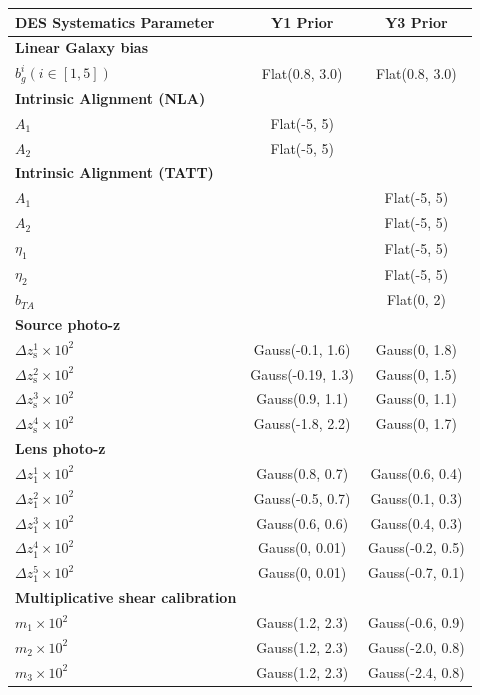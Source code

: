 \begin{table}
\centering
\begin{tabular}{lcc} %
\hline
DES Systematics Parameter &  Y1 Prior & Y3 Prior \\
\hline\hline
\textbf{Linear Galaxy bias} \\
$ b_g^i(i \in [1,5])$ & Flat(0.8, 3.0) & Flat(0.8, 3.0)\\
\hline
\textbf{Intrinsic Alignment (NLA)} \\
$A_{1}$ &  Flat(-5, 5) & \\
$A_{2}$ &  Flat(-5, 5) & \\
\hline
\textbf{Intrinsic Alignment (TATT)} \\
$A_{1}$    & & Flat(-5, 5) \\
$A_{2}$    & & Flat(-5, 5) \\
$\eta_{1}$ & & Flat(-5, 5) \\
$\eta_{2}$ & & Flat(-5, 5) \\
$b_{TA}$   & & Flat(0, 2) \\
\hline
\textbf{Source photo-z} \\
$\Delta z_{\mathrm{s}}^{1} \times 10^{2}$ & Gauss(-0.1, 1.6)  & Gauss(0, 1.8) \\
$\Delta z_{\mathrm{s}}^{2} \times 10^{2}$ & Gauss(-0.19, 1.3) & Gauss(0, 1.5) \\
$\Delta z_{\mathrm{s}}^{3} \times 10^{2}$ & Gauss(0.9, 1.1)   & Gauss(0, 1.1)\\
$\Delta z_{\mathrm{s}}^{4} \times 10^{2}$ & Gauss(-1.8, 2.2)  & Gauss(0, 1.7)\\
\hline
\textbf{Lens photo-z}\\
$\Delta z_{\mathrm{1}}^{1} \times 10^{2}$ & Gauss(0.8, 0.7)  & Gauss(0.6, 0.4)  \\
$\Delta z_{\mathrm{1}}^{2} \times 10^{2}$ & Gauss(-0.5, 0.7) & Gauss(0.1, 0.3)  \\
$\Delta z_{\mathrm{1}}^{3} \times 10^{2}$ & Gauss(0.6, 0.6)  & Gauss(0.4, 0.3)\\
$\Delta z_{\mathrm{1}}^{4} \times 10^{2}$ & Gauss(0, 0.01)   & Gauss(-0.2, 0.5)\\
$\Delta z_{\mathrm{1}}^{5} \times 10^{2}$ & Gauss(0, 0.01)  & Gauss(-0.7, 0.1)\\
\hline
\textbf{Multiplicative shear calibration} \\
$m_{1} \times 10^2$ & Gauss(1.2, 2.3) & Gauss(-0.6, 0.9)\\
$m_{2} \times 10^2$ & Gauss(1.2, 2.3) & Gauss(-2.0, 0.8)\\
$m_{3} \times 10^2$ & Gauss(1.2, 2.3) & Gauss(-2.4, 0.8)\\

\end{tabular}
\end{table}

